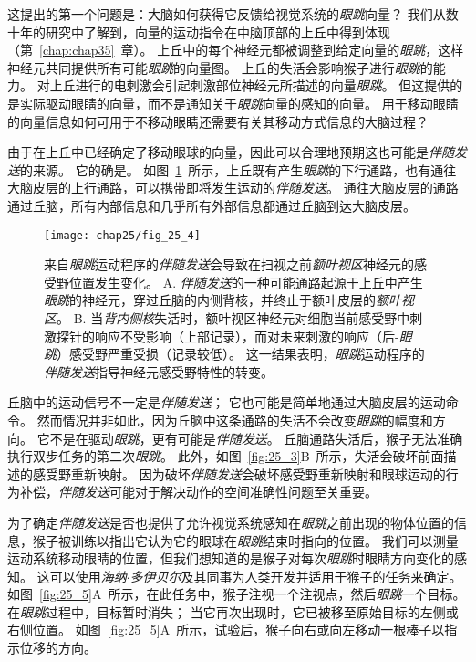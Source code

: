 这提出的第一个问题是：大脑如何获得它反馈给视觉系统的\textit{眼跳}向量？
我们从数十年的研究中了解到，向量的运动指令在中脑顶部的上丘中得到体现（第~\ref{chap:chap35}~章）。
上丘中的每个神经元都被调整到给定向量的\textit{眼跳}，这样神经元共同提供所有可能\textit{眼跳}的向量图。
上丘的失活会影响猴子进行\textit{眼跳}的能力。
对上丘进行的电刺激会引起刺激部位神经元所描述的向量\textit{眼跳}。 
但这提供的是实际驱动眼睛的向量，而不是通知关于\textit{眼跳}向量的感知的向量。
用于移动眼睛的向量信息如何可用于不移动眼睛还需要有关其移动方式信息的大脑过程？


由于在上丘中已经确定了移动眼球的向量，因此可以合理地预期这也可能是\textit{伴随发送}的来源。
它的确是。
如图~\ref{fig:25_4}~所示，上丘既有产生\textit{眼跳}的下行通路，也有通往大脑皮层的上行通路，可以携带即将发生运动的\textit{伴随发送}。
通往大脑皮层的通路通过丘脑，所有内部信息和几乎所有外部信息都通过丘脑到达大脑皮层。


\begin{figure}[htbp]
	\centering
	\texttt{[image: chap25/fig\_25\_4]}
	\caption{来自\textit{眼跳}运动程序的\textit{伴随发送}会导致在扫视之前\textit{额叶视区}神经元的感受野位置发生变化\cite{sommer2008brain}。
		A. \textit{伴随发送}的一种可能通路起源于上丘中产生\textit{眼跳}的神经元，穿过丘脑的内侧背核，并终止于额叶皮层的\textit{额叶视区}。
		B. 当\textit{背内侧核}失活时，额叶视区神经元对细胞当前感受野中刺激探针的响应不受影响（上部记录），而对未来刺激的响应（后-\textit{眼跳}）感受野严重受损（记录较低）。
		这一结果表明，\textit{眼跳}运动程序的\textit{伴随发送}指导神经元感受野特性的转变。}
	\label{fig:25_4}
\end{figure}


丘脑中的运动信号不一定是\textit{伴随发送}；
它也可能是简单地通过大脑皮层的运动命令。
然而情况并非如此，因为丘脑中这条通路的失活不会改变\textit{眼跳}的幅度和方向。
它不是在驱动\textit{眼跳}，更有可能是\textit{伴随发送}。
丘脑通路失活后，猴子无法准确执行双步任务的第二次\textit{眼跳}。
此外，如图~\ref{fig:25_3}B~所示，失活会破坏前面描述的感受野重新映射。
因为破坏\textit{伴随发送}会破坏感受野重新映射和眼球运动的行为补偿，\textit{伴随发送}可能对于解决动作的空间准确性问题至关重要。


为了确定\textit{伴随发送}是否也提供了允许视觉系统感知在\textit{眼跳}之前出现的物体位置的信息，猴子被训练以指出它认为它的眼球在\textit{眼跳}结束时指向的位置。
我们可以测量运动系统移动眼睛的位置，但我们想知道的是猴子对每次\textit{眼跳}时眼睛方向变化的感知。
这可以使用\textit{海纳$\cdot$多伊贝尔}及其同事为人类开发并适用于猴子的任务来确定。
如图~\ref{fig:25_5}A~所示，在此任务中，猴子注视一个注视点，然后\textit{眼跳}一个目标。
在\textit{眼跳}过程中，目标暂时消失；
当它再次出现时，它已被移至原始目标的左侧或右侧位置。
如图~\ref{fig:25_5}A~所示，试验后，猴子向右或向左移动一根棒子以指示位移的方向。


